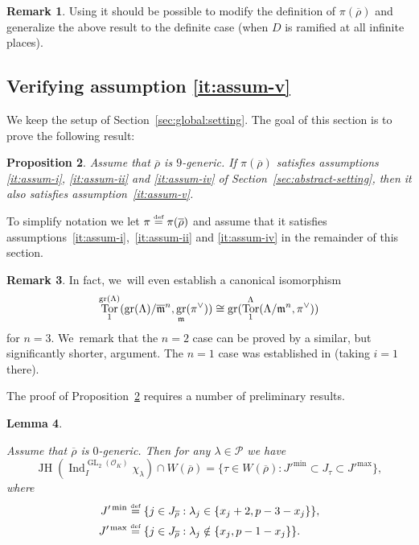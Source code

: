 \documentclass[JEP,XML,SOM,Unicode,NoFloatCountersInSection, NoEqCountersInSection,published]{cedram}
\let\ovl\overline
\newcommand{\defeq}{\stackrel{\textrm{\tiny{\upshape{def}}}}{=}}
\newcommand{\cO}{\mathcal{O}}
\renewcommand{\P}{\mathscr P}
\newcommand{\rhobar}{\overline{\rho}}
\newcommand{\brho}{\overline{\rho}}
\DeclareMathOperator{\GL}{GL}
\DeclareMathOperator{\gr}{gr}
\DeclareMathOperator{\Ind}{Ind}
\DeclareMathOperator{\JH}{\mathrm{JH}}
\DeclareMathOperator{\Tor}{Tor}
\theoremstyle{plain}
\newtheorem{prop}{Proposition}[subsection]
\newtheorem{lem}[prop]{Lemma}
\theoremstyle{definition}
\newtheorem{rem}[prop]{Remark}
\begin{document}
\begin{rem}
{Using \cite[\S 6.5]{EGS} it should be possible to modify the definition of $\pi(\rhobar)$ and generalize the above result to the definite case (\ie when $D$ is ramified at all infinite places).}
\end{rem}

\subsection{Verifying assumption \texorpdfstring{\eqref{it:assum-v}}{(v)}}
\label{subsec:verify:v}

We keep the setup of Section~\ref{sec:global:setting}.
The goal of this section is to prove the following result:

\begin{prop}\label{prop:degenerates}
{Assume that $\brho$ is $9$-generic.}
If $\pi(\rhobar)$ satisfies assumptions \eqref{it:assum-i}, \eqref{it:assum-ii} and \eqref{it:assum-iv} of Section~\ref{sec:abstract-setting}, then it also satisfies assumption~\eqref{it:assum-v}.
\end{prop}

To simplify notation we let $\pi \defeq \pi(\rhobar)$ and assume that it satisfies assumptions~\eqref{it:assum-i},~\eqref{it:assum-ii} and \eqref{it:assum-iv} in the remainder of this section.

\begin{rem}\label{rem:degenerates}
In fact, we~will even establish a canonical isomorphism
\begin{equation*}
\Tor_1^{\gr(\Lambda)}(\gr(\Lambda)/\ovl\m^n,\gr_\m(\pi^{\vee}))\cong \gr(\Tor_1^{\Lambda}(\Lambda/\m^n,\pi^{\vee}))
\end{equation*}
for $n = 3$. We~remark that the $n = 2$ case can be proved by a similar, but significantly shorter, argument.
The $n = 1$ case was established in \cite[Cor.\,2.5.1(i)]{BHHMS4} (taking $i = 1$ there).
\end{rem}

The proof of Proposition~\ref{prop:degenerates} requires a number of preliminary results.

\begin{lem}\label{lem:buzzati-prop4.3-reformulation}

Assume that {$\brho$ is $0$-generic.} Then for any $\lambda \in \P$ we have
\begin{equation*}
\JH(\Ind_I^{\GL_2(\cO_K)} \chi_\lambda) \cap W(\brho) = \{ \tau \in W(\brho): J'^\min \subset J_\tau \subset J'^\max \},
\end{equation*}
where
\begin{align*}
J'^\min &\defeq \{ j \in J_{\brho}: \lambda_j \in \{x_j+2,p-3-x_j\}\}, \\
J'^\max &\defeq \{ j \in J_{\brho}: \lambda_j \notin \{x_j,p-1-x_j\}\}.
\end{align*}
\end{lem}
\end{document}

